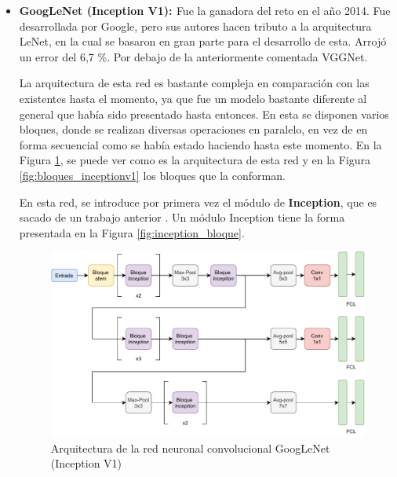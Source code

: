 \begin{itemize}
    \item \textbf{GoogLeNet (Inception V1): \cite{szegedy2014going}} Fue la ganadora del reto en el año 2014. Fue desarrollada por Google, pero sus autores hacen tributo a la arquitectura LeNet, en la cual se basaron en gran parte para el desarrollo de esta. Arrojó un error del 6,7 \%. Por debajo de la anteriormente comentada VGGNet.
    
    La arquitectura de esta red es bastante compleja en comparación con las existentes hasta el momento, ya que fue un modelo bastante diferente al general que había sido presentado hasta entonces. En esta se disponen varios bloques, donde se realizan diversas operaciones en paralelo, en vez de en forma secuencial como se había estado haciendo hasta este momento. En la Figura \ref{fig:googlenet}, se puede ver como es la arquitectura de esta red y en la Figura \ref{fig:bloques_inceptionv1} los bloques que la conforman.
    
    En esta red, se introduce por primera vez el módulo de \textbf{Inception}, que es sacado de un trabajo anterior \cite{szegedy2014going}. Un módulo Inception tiene la forma presentada en la Figura \ref{fig:inception_bloque}.
    
    \begin{figure}[!h]
        \centering
        \includegraphics[width=1\textwidth]{figuras/desarrollo teorico/desarrollo_teorico-Inception V1.pdf}
        \caption{Arquitectura de la red neuronal convolucional GoogLeNet (Inception V1)}
        \label{fig:googlenet}
    \end{figure}
    

\end{itemize}

